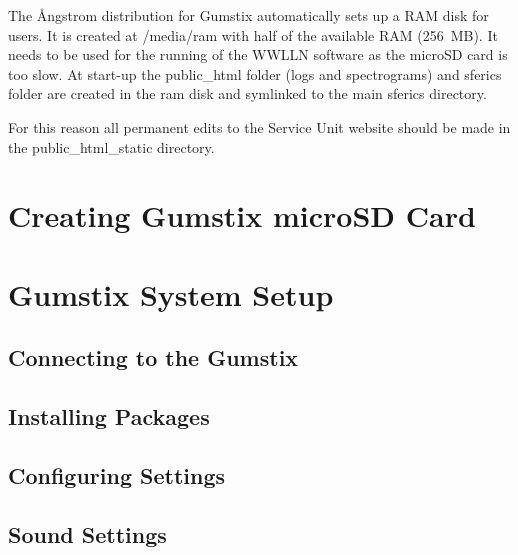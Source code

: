 The \r{A}ngstrom distribution for Gumstix automatically sets up a RAM disk for users.
It is created at /media/ram with half of the available RAM (256~MB).
It needs to be used for the running of the WWLLN software as the microSD card is too slow.
At start-up the public\_html folder (logs and spectrograms) and sferics folder are created in the ram disk and symlinked to the main sferics directory.

For this reason all permanent edits to the Service Unit website should be made in the public\_html\_static directory.

\section{Creating Gumstix microSD Card}

%

\section{Gumstix System Setup}

\subsection{Connecting to the Gumstix}

\subsection{Installing Packages}

%

\subsection{Configuring Settings}

%

\subsection{Sound Settings}
